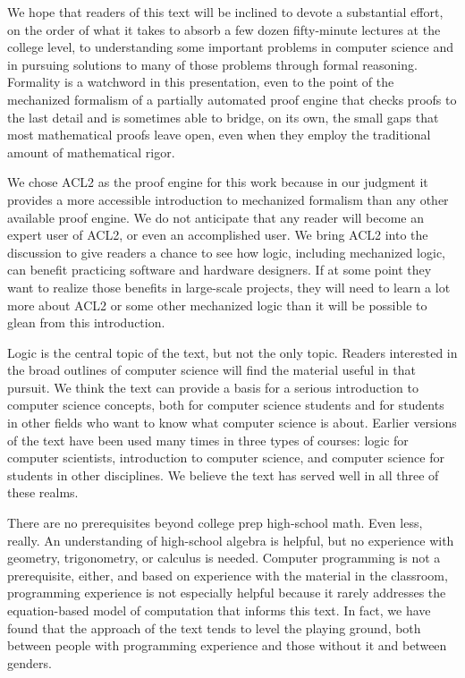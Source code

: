We hope that readers of this text will be inclined
to devote a substantial effort, on the order
of what it takes to absorb a few dozen fifty-minute
lectures at the college level,
to understanding some important problems in computer science and
in pursuing solutions to many of those problems through formal reasoning.
Formality is a watchword in this presentation, even to the
point of the mechanized formalism of a partially automated proof engine
that checks proofs to the last detail and is sometimes able
to bridge, on its own, the small gaps that most mathematical
proofs leave open, even when they employ the traditional amount
of mathematical rigor.

We chose ACL2 as the proof engine for this work
because in our judgment it provides a more accessible
introduction to mechanized formalism than any other
available proof engine. We do not anticipate that any
reader will become an expert user of ACL2, or even 
an accomplished user. We bring ACL2 into the discussion 
to give readers a chance to see how logic, including mechanized logic, 
can benefit practicing software and hardware designers.
If at some point they want to realize those benefits in
large-scale projects, they will need to learn a lot more
about ACL2 or some other mechanized logic than it will
be possible to glean from this introduction.

Logic is the central topic of the text, but not the only topic.
Readers interested in the broad outlines of computer science
will find the material useful in that pursuit. 
We think the text can provide a basis for a serious introduction
to computer science concepts, both for computer science students
and for students in other fields who want to know
what computer science is about.
Earlier versions of the text have been used many times
in three types of courses: logic for computer scientists,
introduction to computer science, and computer science for
students in other disciplines. 
We believe the text has served well in all three of these realms.

There are no prerequisites beyond college prep high-school math. 
Even less, really.
An understanding of high-school algebra is helpful, 
but no experience with geometry, trigonometry, or calculus is needed.
Computer programming is not a prerequisite, either, 
and based on experience with the material in the classroom, 
programming experience is not especially helpful 
because it rarely addresses the equation-based model of computation that 
informs this text. In fact, we have found that the approach of the text
tends to level the playing ground, both between people with programming 
experience and those without it and between genders.

